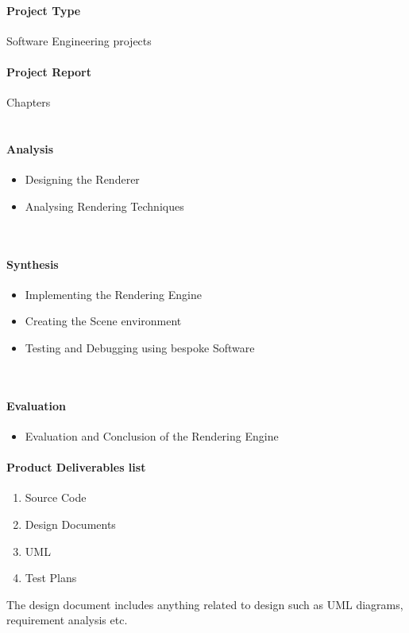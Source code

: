 \paragraph{Project Type}Software Engineering projects
\paragraph{Project Report}Chapters \\
\\
\paragraph{Analysis} 
\begin{itemize}
  \item Designing the Renderer
  \item Analysing Rendering Techniques
\end{itemize}
\\
\paragraph{Synthesis} 
\begin{itemize}
  \item Implementing the Rendering Engine
  \item Creating the Scene environment
  \item Testing and Debugging using bespoke Software
\end{itemize}
\\
\paragraph{Evaluation}
\begin{itemize}
    \item Evaluation and Conclusion of the Rendering Engine
\end{itemize}



\paragraph{Product Deliverables list}
\begin{enumerate}
    \item Source Code 
    \item Design Documents
    \item UML
    \item Test Plans
\end{enumerate}
The design document includes anything related to design such as UML diagrams, requirement analysis etc.

